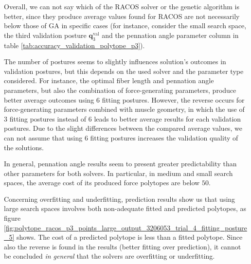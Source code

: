 Overall, we can not say which of the RACOS solver or the genetic algorithm is better, since they produce average values found for RACOS are not necessarily below those of GA in specific cases (for instance, consider the small search space, the third validation posture $\mathbf{q}_3^{\text{val}}$ and the pennation angle parameter column in table \ref{tab:accuracy_validation_polytope_p3}).

The number of postures seems to slightly influences solution's outcomes in validation postures, but this depends on the used solver and the parameter type considered. For instance, the optimal fiber length and pennation angle parameters, but also the combination of force-generating parameters, produce better average outcomes using 6 fitting postures. However, the reverse occurs for force-generating parameters combined with muscle geometry, in which the use of $3$ fitting postures instead of $6$ leads to better average results for each validation postures. Due to the slight differences between the compared average values, we can not assume that using $6$ fitting postures increases the validation quality of the solutions.

In general, pennation angle results seem to present greater predictability than other parameters for both solvers. In particular, in medium and small search spaces, the average cost of its produced force polytopes are below $50$.

Concerning overfitting and underfitting, prediction results show us that using large search spaces involves both non-adequate fitted and predicted polytopes, as figure \ref{fig:polytope_racos_p3_points_large_output_3206053_trial_4_fitting_posture_5} shows. The cost of a predicted polytope is less than a fitted polytope. Since also the reverse is found in the results (better fitting over prediction), it cannot be concluded \emph{in general} that the solvers are overfitting or underfitting.

